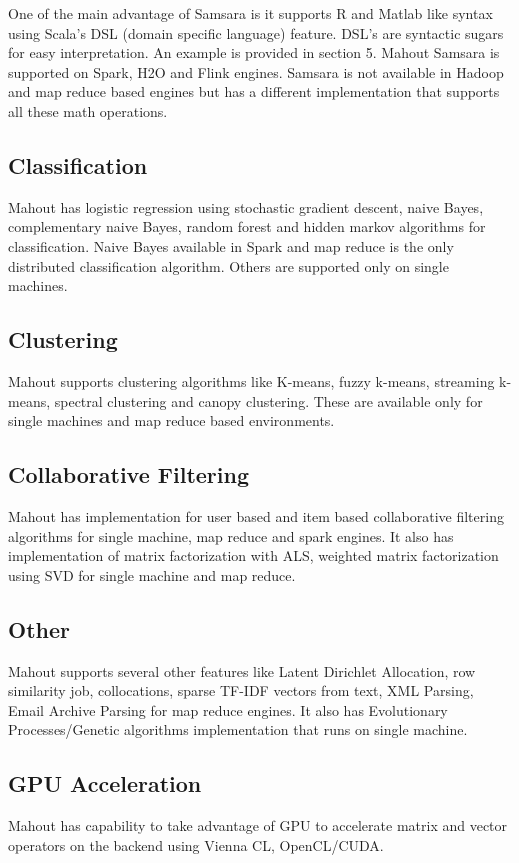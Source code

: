 \documentclass[9pt,twocolumn,twoside]{../../styles/osajnl}
\begin{document}
One of the main advantage of Samsara is it supports R and Matlab like
syntax using Scala's DSL (domain specific language) feature. DSL's are
syntactic sugars for easy interpretation. An example is provided in
section 5. Mahout Samsara is supported on Spark, H2O and Flink
engines. Samsara is not available in Hadoop and map reduce based
engines but has a different implementation that supports all these math
operations.

\subsection{Classification}
Mahout has logistic regression using stochastic gradient descent,
naive Bayes, complementary naive Bayes, random forest and hidden
markov algorithms for classification. Naive Bayes available in Spark
and map reduce is the only distributed classification algorithm. Others
are supported only on single machines.

\subsection{Clustering}
Mahout supports clustering algorithms like K-means, fuzzy k-means,
streaming k-means, spectral clustering and canopy clustering. These
are available only for single machines and map reduce based
environments.

\subsection{Collaborative Filtering}
Mahout has implementation for user based and item based collaborative
filtering algorithms for single machine, map reduce and spark
engines. It also has implementation of matrix factorization with ALS,
weighted matrix factorization using SVD for single machine and map
reduce.

\subsection{Other}
Mahout supports several other features like Latent Dirichlet
Allocation, row similarity job, collocations, sparse TF-IDF vectors
from text, XML Parsing, Email Archive Parsing for map reduce
engines. It also has Evolutionary Processes/Genetic algorithms
implementation that runs on single machine.

\subsection{GPU Acceleration}
Mahout has capability to take advantage of GPU to accelerate matrix
and vector operators on the backend using Vienna CL, OpenCL/CUDA.
\end{document}
